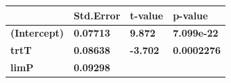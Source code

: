 \documentclass[]{article}
\begin{document}
\begin{longtable}[]{@{}llll@{}}
\toprule
\begin{minipage}[b]{0.43\columnwidth}\raggedright\strut
~\strut
\end{minipage} & \begin{minipage}[b]{0.17\columnwidth}\raggedright\strut
Std.Error\strut
\end{minipage} & \begin{minipage}[b]{0.13\columnwidth}\raggedright\strut
t-value\strut
\end{minipage} & \begin{minipage}[b]{0.16\columnwidth}\raggedright\strut
p-value\strut
\end{minipage}\tabularnewline
\midrule
\endhead
\begin{minipage}[t]{0.43\columnwidth}\raggedright\strut
\textbf{(Intercept)}\strut
\end{minipage} & \begin{minipage}[t]{0.17\columnwidth}\raggedright\strut
\textbf{0.07713}\strut
\end{minipage} & \begin{minipage}[t]{0.13\columnwidth}\raggedright\strut
\textbf{9.872}\strut
\end{minipage} & \begin{minipage}[t]{0.16\columnwidth}\raggedright\strut
\textbf{7.099e-22}\strut
\end{minipage}\tabularnewline
\begin{minipage}[t]{0.43\columnwidth}\raggedright\strut
\textbf{trtT}\strut
\end{minipage} & \begin{minipage}[t]{0.17\columnwidth}\raggedright\strut
\textbf{0.08638}\strut
\end{minipage} & \begin{minipage}[t]{0.13\columnwidth}\raggedright\strut
\textbf{-3.702}\strut
\end{minipage} & \begin{minipage}[t]{0.16\columnwidth}\raggedright\strut
\textbf{0.0002276}\strut
\end{minipage}\tabularnewline
\begin{minipage}[t]{0.43\columnwidth}\raggedright\strut
\textbf{limP}\strut
\end{minipage} & \begin{minipage}[t]{0.17\columnwidth}\raggedright\strut
\textbf{0.09298}\strut
\end{minipage} & \begin{minipage}[t]{0.13\columnwidth}\raggedright\strut

\end{minipage}
\end{longtable}
\end{document}
